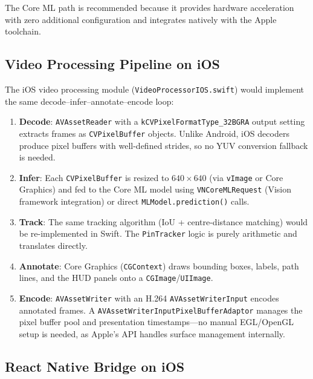 \documentclass{zc-ust-hw}
\begin{document}
The Core ML path is recommended because it provides hardware acceleration with zero additional configuration and integrates natively with the Apple toolchain.

\subsection{Video Processing Pipeline on iOS}

The iOS video processing module (\texttt{VideoProcessorIOS.swift}) would implement the same decode--infer--annotate--encode loop:

\begin{enumerate}
    \item \textbf{Decode}: \texttt{AVAssetReader} with a \texttt{kCVPixelFormatType\_32BGRA} output setting extracts frames as \texttt{CVPixelBuffer} objects.
    Unlike Android, iOS decoders produce pixel buffers with well-defined strides, so no YUV conversion fallback is needed.

    \item \textbf{Infer}: Each \texttt{CVPixelBuffer} is resized to $640 \times 640$ (via \texttt{vImage} or Core Graphics) and fed to the Core ML model using \texttt{VNCoreMLRequest} (Vision framework integration) or direct \texttt{MLModel.prediction()} calls.

    \item \textbf{Track}: The same tracking algorithm (IoU + centre-distance matching) would be re-implemented in Swift.
    The \texttt{PinTracker} logic is purely arithmetic and translates directly.

    \item \textbf{Annotate}: Core Graphics (\texttt{CGContext}) draws bounding boxes, labels, path lines, and the HUD panels onto a \texttt{CGImage}/\texttt{UIImage}.

    \item \textbf{Encode}: \texttt{AVAssetWriter} with an H.264 \texttt{AVAssetWriterInput} encodes annotated frames.
    A \texttt{AVAssetWriterInputPixelBufferAdaptor} manages the pixel buffer pool and presentation timestamps—no manual EGL/OpenGL setup is needed, as Apple's API handles surface management internally.
\end{enumerate}

\subsection{React Native Bridge on iOS}
\end{document}
